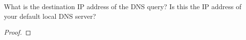 \documentclass[../../main.tex]{subfiles}
\begin{document}
\begin{wts}
What is the destination IP address of the DNS query? Is this the IP address of your default local DNS server?
\end{wts}
\begin{proof}

\end{proof}
\end{document}
